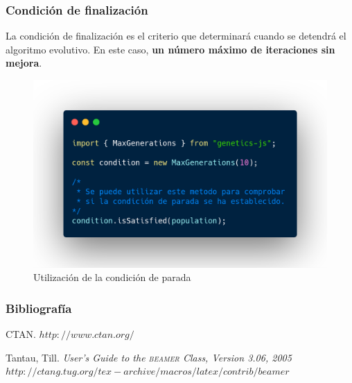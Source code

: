 \documentclass{beamer}
\newcommand{\beamer}{\textsc{beamer}}
\begin{document}
\begin{frame}
\frametitle{Condición de finalización}

La condición de finalización es el criterio que determinará cuando se detendrá el algoritmo evolutivo. En este caso, \textbf{un número máximo de iteraciones sin mejora}.

\begin{figure}
    \centering
    \includegraphics[scale=0.22]{pres/img/desarrollo/termination-example.png}
    \caption{Utilización de la condición de parada}
    \label{fig:my_label}
\end{figure}

\end{frame}


\begin{frame}
  \frametitle{Bibliografía}

  \begin{thebibliography}{10}

    \beamertemplatebookbibitems
    CTAN. {\small $http://www.ctan.org/$}

    \beamertemplatebookbibitems
    Tantau, Till. 
    \emph{User's Guide to the \beamer{} Class, Version 3.06, 2005} 
    {\small $http://ctang.tug.org/tex-archive/macros/latex/contrib/beamer$}


  \end{thebibliography}
\end{frame}
\end{document}
